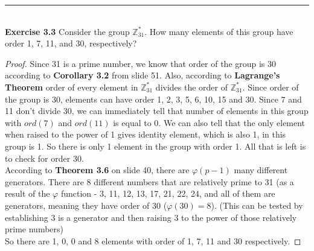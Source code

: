 \documentclass[a4paper]{article}
\begin{document}
\noindent\rule{12cm}{0.4pt}\\
\noindent \textbf{Exercise 3.3} Consider the group $\mathbb{Z}^{*}_{31}$. How many elements of this group have order 1, 7, 11, and 30, respectively?
\begin{proof}
Since 31 is a prime number, we know that order of the group is 30 according to \textbf{Corollary 3.2} from slide 51. Also, according to \textbf{Lagrange's Theorem} order of every element in $\mathbb{Z}^{*}_{31}$ divides the order of $\mathbb{Z}^{*}_{31}$. Since order of the group is 30, elements can have order 1, 2, 3, 5, 6, 10, 15 and 30. Since 7 and 11 don't divide 30, we can immediately tell that number of elements in this group with $ord(7)$ and $ord(11)$ is equal to 0. We can also tell that the only element when raised to the power of 1 gives identity element, which is also 1, in this group is 1. So there is only 1 element in the group with order 1. All that is left is to check for order 30.\\
According to \textbf{Theorem 3.6} on slide 40, there are $\varphi(p - 1)$ many different generators. There are 8 different numbers that are relatively prime to 31 (as a result of the $\varphi$ function - 3, 11, 12, 13, 17, 21, 22, 24, and all of them are generators, meaning they have order of 30 ($\varphi(30)=8$). (This can be tested by establishing 3 is a generator and then raising 3 to the power of those relatively prime numbers)\\
So there are 1, 0, 0 and 8 elements with order of 1, 7, 11 and 30 respectively.
\end{proof}
\end{document}
